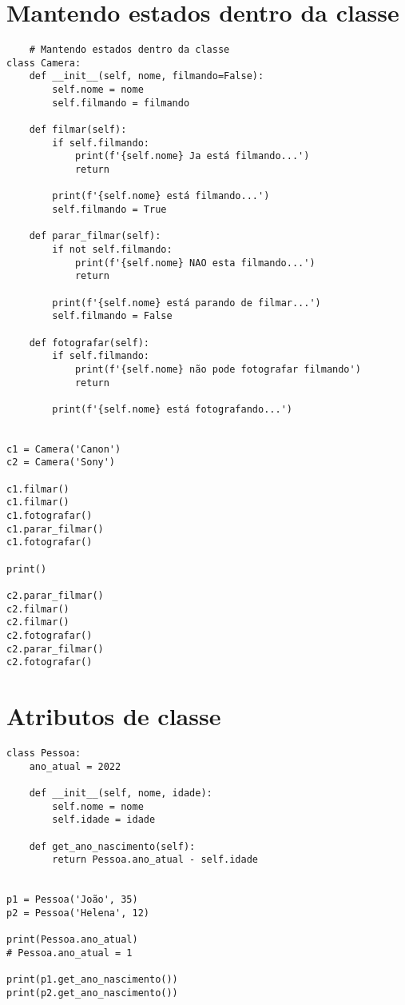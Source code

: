 \documentclass{article}
\begin{document}
\section{ Mantendo estados dentro da classe}
\begin{lstlisting}
    # Mantendo estados dentro da classe
class Camera:
    def __init__(self, nome, filmando=False):
        self.nome = nome
        self.filmando = filmando

    def filmar(self):
        if self.filmando:
            print(f'{self.nome} Ja está filmando...')
            return

        print(f'{self.nome} está filmando...')
        self.filmando = True

    def parar_filmar(self):
        if not self.filmando:
            print(f'{self.nome} NAO esta filmando...')
            return

        print(f'{self.nome} está parando de filmar...')
        self.filmando = False

    def fotografar(self):
        if self.filmando:
            print(f'{self.nome} não pode fotografar filmando')
            return

        print(f'{self.nome} está fotografando...')


c1 = Camera('Canon')
c2 = Camera('Sony')

c1.filmar()
c1.filmar()
c1.fotografar()
c1.parar_filmar()
c1.fotografar()

print()

c2.parar_filmar()
c2.filmar()
c2.filmar()
c2.fotografar()
c2.parar_filmar()
c2.fotografar()
\end{lstlisting}

\section{Atributos de classe}
\begin{lstlisting}
class Pessoa:
    ano_atual = 2022

    def __init__(self, nome, idade):
        self.nome = nome
        self.idade = idade

    def get_ano_nascimento(self):
        return Pessoa.ano_atual - self.idade


p1 = Pessoa('João', 35)
p2 = Pessoa('Helena', 12)

print(Pessoa.ano_atual)
# Pessoa.ano_atual = 1

print(p1.get_ano_nascimento())
print(p2.get_ano_nascimento())
\end{lstlisting} 
\end{document}
